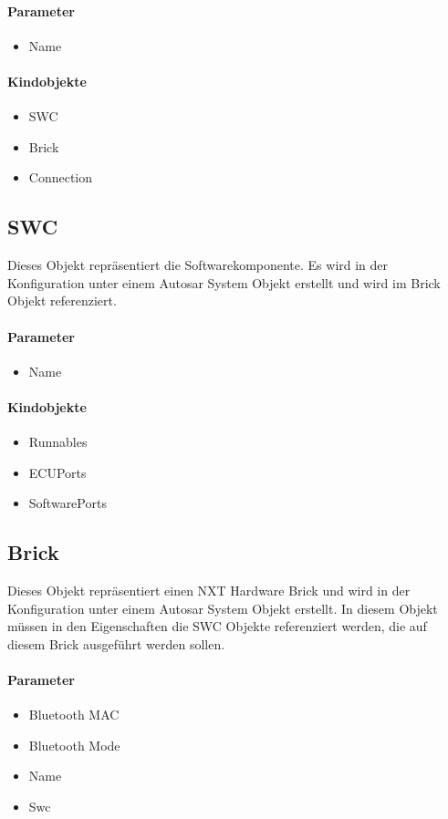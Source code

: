 \paragraph{Parameter}
\begin{itemize}
\item Name
\end{itemize}
\paragraph{Kindobjekte}
\begin{itemize}
\item SWC
\item Brick
\item Connection
\end{itemize}

\subsection{SWC}
Dieses Objekt repräsentiert die Softwarekomponente. Es wird in der Konfiguration unter einem \frqq{}Autosar System\flqq{}  Objekt erstellt und  wird im \frqq{}Brick\flqq{} Objekt referenziert.
\paragraph{Parameter}
\begin{itemize}
\item Name
\end{itemize}
\paragraph{Kindobjekte}
\begin{itemize}
\item Runnables
\item ECUPorts
\item SoftwarePorts
\end{itemize}

\subsection{Brick}
Dieses Objekt repräsentiert einen NXT Hardware Brick und wird in der Konfiguration unter einem \frqq{}Autosar System\flqq{} Objekt erstellt. In diesem Objekt müssen in den Eigenschaften die \frqq{}SWC\flqq{} Objekte referenziert werden, die auf diesem Brick ausgeführt werden sollen.
\paragraph{Parameter}
\begin{itemize}
\item Bluetooth MAC
\item Bluetooth Mode
\item Name
\item Swc
\end{itemize}
